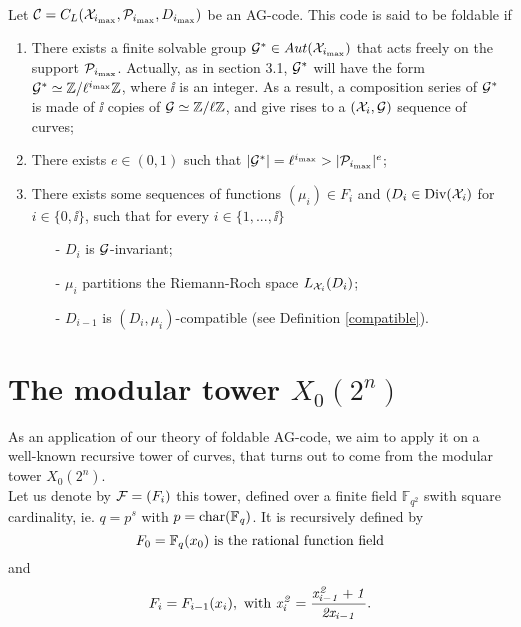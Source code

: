 \documentclass[10pt]{article}
\begin{document}
\s

\begin{def1}  \\
Let $\mathcal{C} = C_L(\mathcal{X}_{i_{\rm{max}}},\mathcal{P}_{i_{\rm{max}}},D_{i_{\rm{max}}})$ be an AG-code. This code is said to be foldable if \begin{enumerate}
\item There exists a finite solvable group $\mathcal{G}^* \in Aut(\mathcal{X}_{i_{\rm{max}}})$ that acts freely on the support $\mathcal{P}_{i_{\rm{max}}}$. Actually, as in section 3.1, $\mathcal{G}^*$ will have the form $\mathcal{G}^* \simeq \mathbb{Z}/\ell^{i_{\rm{max}}}\mathbb{Z}$, where $\ii$ is an integer. As a result, a composition series of $\mathcal{G}^*$ is made of $\ii$ copies of $\mathcal{G} \simeq \mathbb{Z}/\ell\mathbb{Z}$, and give rises to a $(\mathcal{X}_i,\mathcal{G})$ sequence of curves;
\item There exists $e \in (0,1)$ such that $|\mathcal{G}^*| = \ell^{i_{\rm{max}}} > |\mathcal{P}_{i_{\rm{max}}}|^e$; 
\item There exists some sequences of functions $(\mu_i) \in F_i$ and $(D_i \in \rm Div \it(\mathcal{X}_i)$ for $i \in \{0,\ii\}$, such that for every $i \in \{1,...,\ii\}$
\begin{itemize}
\item[-] $D_i$ is $\mathcal{G}$-invariant;
\item[-] $\mu_i$ partitions the Riemann-Roch space $L_{\mathcal{X}_i}(D_i)$;
\item[-] $D_{i-1}$ is $(D_i,\mu_i)$-compatible (see Definition \ref{compatible}).
\end{itemize}
\end{enumerate}
\end{def1}

\s



\section{The modular tower $X_0(2^n)$}

\s


As an application of our theory of foldable AG-code, we aim to apply it on a well-known recursive tower of curves, that turns out to come from the modular tower $X_0(2^n)$. \\
Let us denote by $\mathcal{F} = (F_i)$ this tower, defined over a finite field $\mathbb{F}_{q^2}$ swith square cardinality, ie. $q=p^{s}$ with $p = \rm char \it (\mathbb{F}_q)$. It is recursively defined by 
\[ F_0 = \fq(x_0) \ \rm{is \ the \ rational \ function \ field}\]
and
\begin{equation} \label{defining equation}
F_i = F_{i-1}(x_i), \ \rm with \ \it x_i^2=\dfrac{x_{i-1}^2+1}{2x_{i-1}}.
\end{equation}
\end{document}

